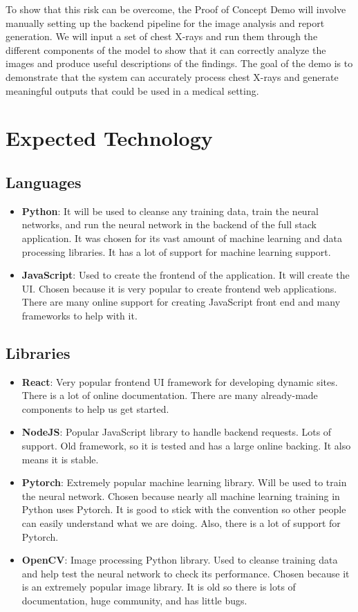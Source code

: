 \documentclass{article}
\begin{document}
To show that this risk can be overcome, the Proof of Concept Demo will involve
manually setting up the backend pipeline for the image analysis and report generation.
We will input a set of chest X-rays and run them through the different components of
the model to show that it can correctly analyze the images and produce useful
descriptions of the findings. The goal of the demo is to demonstrate that the system
can accurately process chest X-rays and generate meaningful outputs that could be
used in a medical setting.

\section{Expected Technology}

\subsection{Languages}
\begin{itemize}
  \item \textbf{Python}: It will be used to cleanse any training data, train the neural networks,
    and run the neural network in the backend of the full stack application. It was chosen for its
    vast amount of machine learning and data processing libraries. It has a lot of support for
    machine learning support.
  \item \textbf{JavaScript}: Used to create the frontend of the application. It will create the UI.
    Chosen because it is very popular to create frontend web applications. There are many online 
    support for creating JavaScript front end and many frameworks to help with it.
\end{itemize}

\subsection{Libraries}
\begin{itemize}
  \item \textbf{React}: Very popular frontend UI framework for developing dynamic sites. There is
    a lot of online documentation. There are many already-made components to help us get started.
  \item \textbf{NodeJS}: Popular JavaScript library to handle backend requests. Lots of support. 
    Old framework, so it is tested and has a large online backing. It also means it is stable.
  \item \textbf{Pytorch}: Extremely popular machine learning library. Will be used to train the 
    neural network. Chosen because nearly all machine learning training in Python uses Pytorch. It
    is good to stick with the convention so other people can easily understand what we are doing. 
    Also, there is a lot of support for Pytorch.
  \item \textbf{OpenCV}: Image processing Python library. Used to cleanse training data and help
    test the neural network to check its performance. Chosen because it is an extremely popular
    image library. It is old so there is lots of documentation, huge community, and has little 
    bugs.
\end{itemize}
\end{document}
